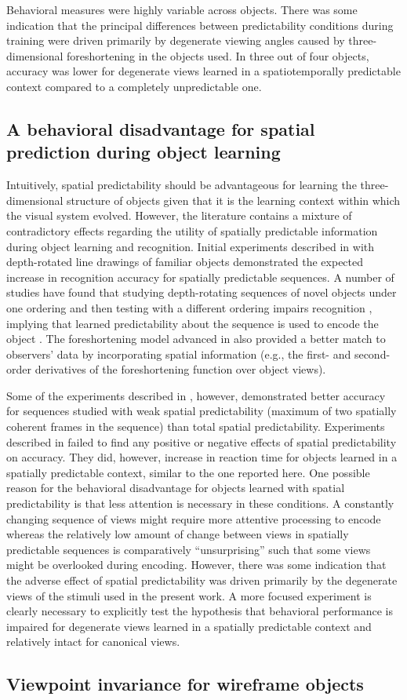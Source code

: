 \documentclass[dwyatte_dissertation.tex]{subfiles}
\begin{document}
Behavioral measures were highly variable across objects. There was some indication that the principal differences between predictability conditions during training were driven primarily by degenerate viewing angles caused by three-dimensional foreshortening in the objects used. In three out of four objects, accuracy was lower for degenerate views learned in a spatiotemporally predictable context compared to a completely unpredictable one.

\subsection{A behavioral disadvantage for spatial prediction during object learning}
Intuitively, spatial predictability should be advantageous for learning the three-dimensional structure of objects given that it is the learning context within which the visual system evolved. However, the literature contains a mixture of contradictory effects regarding the utility of spatially predictable information during object learning and recognition. Initial experiments described in  with depth-rotated line drawings of familiar objects demonstrated the expected increase in recognition accuracy for spatially predictable sequences. A number of studies have found that studying depth-rotating sequences of novel objects under one ordering and then testing with a different ordering impairs recognition \cite{Stone98,VuongTarr04,ChuangVuongBulthoff12}, implying that learned predictability about the sequence is used to encode the object \cite{BalasSinha09c}. The foreshortening model advanced in \cite{BalasSinha09b} also provided a better match to observers' data by incorporating spatial information (e.g., the first- and second-order derivatives of the foreshortening function over object views).

Some of the experiments described in , however, demonstrated better accuracy for sequences studied with weak spatial predictability (maximum of two spatially coherent frames in the sequence) than total spatial predictability. Experiments described in  failed to find any positive or negative effects of spatial predictability on accuracy. They did, however, increase in reaction time for objects learned in a spatially predictable context, similar to the one reported here. One possible reason for the behavioral disadvantage for objects learned with spatial predictability is that less attention is necessary in these conditions. A constantly changing sequence of views might require more attentive processing to encode whereas the relatively low amount of change between views in spatially predictable sequences is comparatively ``unsurprising'' such that some views might be overlooked during encoding. However, there was some indication that the adverse effect of spatial predictability was driven primarily by the degenerate views of the stimuli used in the present work. A more focused experiment is clearly necessary to explicitly test the hypothesis that behavioral performance is impaired for degenerate views learned in a spatially predictable context and relatively intact for canonical views. 

\subsection{Viewpoint invariance for wireframe objects}



\end{document}
